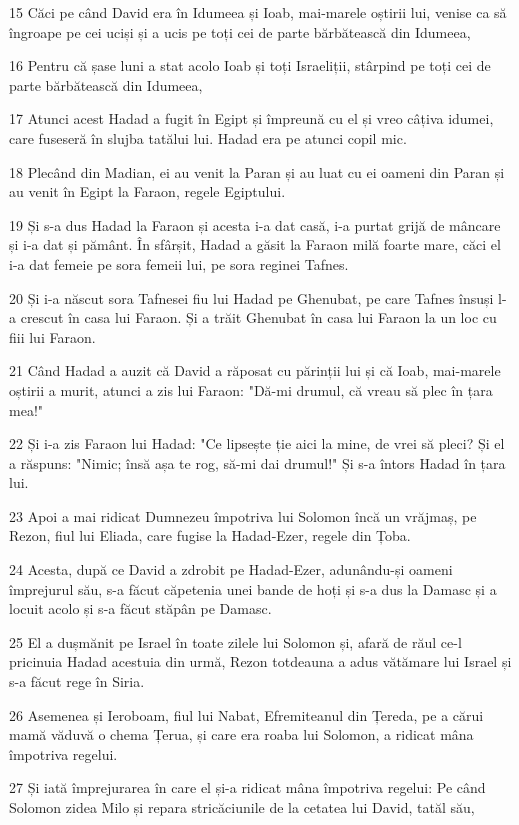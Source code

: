 \par 15 Căci pe când David era în Idumeea și Ioab, mai-marele oștirii lui, venise ca să îngroape pe cei uciși și a ucis pe toți cei de parte bărbătească din Idumeea,
\par 16 Pentru că șase luni a stat acolo Ioab și toți Israeliții, stârpind pe toți cei de parte bărbătească din Idumeea,
\par 17 Atunci acest Hadad a fugit în Egipt și împreună cu el și vreo câțiva idumei, care fuseseră în slujba tatălui lui. Hadad era pe atunci copil mic.
\par 18 Plecând din Madian, ei au venit la Paran și au luat cu ei oameni din Paran și au venit în Egipt la Faraon, regele Egiptului.
\par 19 Și s-a dus Hadad la Faraon și acesta i-a dat casă, i-a purtat grijă de mâncare și i-a dat și pământ. În sfârșit, Hadad a găsit la Faraon milă foarte mare, căci el i-a dat femeie pe sora femeii lui, pe sora reginei Tafnes.
\par 20 Și i-a născut sora Tafnesei fiu lui Hadad pe Ghenubat, pe care Tafnes însuși l-a crescut în casa lui Faraon. Și a trăit Ghenubat în casa lui Faraon la un loc cu fiii lui Faraon.
\par 21 Când Hadad a auzit că David a răposat cu părinții lui și că Ioab, mai-marele oștirii a murit, atunci a zis lui Faraon: "Dă-mi drumul, că vreau să plec în țara mea!"
\par 22 Și i-a zis Faraon lui Hadad: "Ce lipsește ție aici la mine, de vrei să pleci? Și el a răspuns: "Nimic; însă așa te rog, să-mi dai drumul!" Și s-a întors Hadad în țara lui.
\par 23 Apoi a mai ridicat Dumnezeu împotriva lui Solomon încă un vrăjmaș, pe Rezon, fiul lui Eliada, care fugise la Hadad-Ezer, regele din Țoba.
\par 24 Acesta, după ce David a zdrobit pe Hadad-Ezer, adunându-și oameni împrejurul său, s-a făcut căpetenia unei bande de hoți și s-a dus la Damasc și a locuit acolo și s-a făcut stăpân pe Damasc.
\par 25 El a dușmănit pe Israel în toate zilele lui Solomon și, afară de răul ce-l pricinuia Hadad acestuia din urmă, Rezon totdeauna a adus vătămare lui Israel și s-a făcut rege în Siria.
\par 26 Asemenea și Ieroboam, fiul lui Nabat, Efremiteanul din Țereda, pe a cărui mamă văduvă o chema Țerua, și care era roaba lui Solomon, a ridicat mâna împotriva regelui.
\par 27 Și iată împrejurarea în care el și-a ridicat mâna împotriva regelui: Pe când Solomon zidea Milo și repara stricăciunile de la cetatea lui David, tatăl său,
